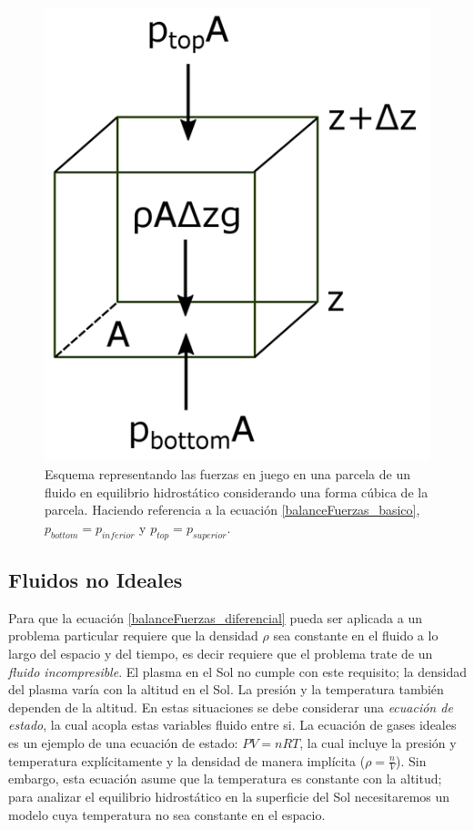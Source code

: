 \begin{figure}[!ht]
	\centering
	\includegraphics[scale=0.4]{Figuras/L2_hydrostatic_copy.png}
	\caption{Esquema representando las fuerzas en juego en una parcela de un
	fluido en equilibrio hidrostático considerando una forma cúbica de la
	parcela. Haciendo referencia a la ecuación \ref*{balanceFuerzas_basico},
	\(p_{bottom} = p_{inferior}\) y \(p_{top} = p_{superior}\).
	\cite{eqhsPennStateWebsite}}
	\label{balanceFuerzas_imgCubo}
\end{figure}

\subsection{Fluidos no Ideales}
Para que la ecuación \ref{balanceFuerzas_diferencial} pueda ser aplicada a un
problema particular requiere que la densidad \(\rho\) sea constante en el fluido
a lo largo del espacio y del tiempo, es decir requiere que el problema trate de
un \textit{fluido incompresible}. El plasma en el Sol no cumple con este
requisito; la densidad del plasma varía con la altitud en el Sol. La presión y
la temperatura también dependen de la altitud. En estas situaciones se debe
considerar una \textit{ecuación de estado}, la cual acopla estas variables
fluido entre si. La ecuación de gases ideales es un ejemplo de una ecuación de
estado: \(PV = nRT\), la cual incluye la presión y temperatura explícitamente y
la densidad de manera implícita (\(\rho = \frac{n}{V}\)). Sin embargo, esta
ecuación asume que la temperatura es constante con la altitud; para analizar el
equilibrio hidrostático en la superficie del Sol necesitaremos un modelo cuya
temperatura no sea constante en el espacio.

